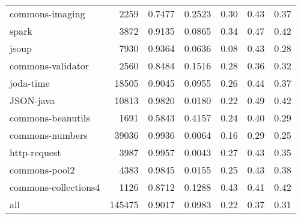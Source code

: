 \begin{table*}
\begin{tabular}{lrrrrrr}
        commons-imaging &    2259 &          0.7477 &          0.2523 &         0.30 &         0.43 &             0.37 \\
                  spark &    3872 &          0.9135 &          0.0865 &         0.34 &         0.47 &             0.42 \\
                  jsoup &    7930 &          0.9364 &          0.0636 &         0.08 &         0.43 &             0.28 \\
      commons-validator &    2560 &          0.8484 &          0.1516 &         0.28 &         0.36 &             0.32 \\
              joda-time &   18505 &          0.9045 &          0.0955 &         0.26 &         0.44 &             0.37 \\
              JSON-java &   10813 &          0.9820 &          0.0180 &         0.22 &         0.49 &             0.42 \\
      commons-beanutils &    1691 &          0.5843 &          0.4157 &         0.24 &         0.40 &             0.29 \\
        commons-numbers &   39036 &          0.9936 &          0.0064 &         0.16 &         0.29 &             0.25 \\
           http-request &    3987 &          0.9957 &          0.0043 &         0.27 &         0.43 &             0.35 \\
          commons-pool2 &    4383 &          0.9845 &          0.0155 &         0.25 &         0.43 &             0.38 \\
   commons-collections4 &    1126 &          0.8712 &          0.1288 &         0.43 &         0.41 &             0.42 \\
                    all &  145475 &          0.9017 &          0.0983 &         0.22 &         0.37 &             0.31 \\
\bottomrule
\end{tabular}
\end{table*}

